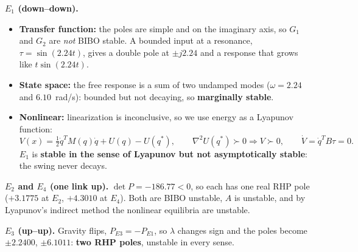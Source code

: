 \documentclass[12pt,a4paper]{article}
\begin{document}
\textbf{$E_1$ (down--down).}
\begin{itemize}
\item \textbf{Transfer function:} the poles are simple and on the imaginary axis, so $G_1$ and $G_2$ are \emph{not} BIBO stable. A bounded input at a resonance, $\tau=\sin(2.24t)$, gives a double pole at $\pm j2.24$ and a response that grows like $t\sin(2.24t)$.
\item \textbf{State space:} the free response is a sum of two undamped modes ($\omega=2.24$ and $6.10$~rad/s): bounded but not decaying, so \textbf{marginally stable}.
\item \textbf{Nonlinear:} linearization is inconclusive, so we use energy as a Lyapunov function:
\begin{equation}
V(x)=\tfrac12\dot q^TM(q)\dot q+U(q)-U(q^*),\qquad \nabla^2U(q^*)\succ0\Rightarrow V\succ0,\qquad \dot V=\dot q^TB\tau=0 .
\end{equation}
$E_1$ is \textbf{stable in the sense of Lyapunov but not asymptotically stable}: the swing never decays.
\end{itemize}

\textbf{$E_2$ and $E_4$ (one link up).} $\det P=-186.77<0$, so each has one real RHP pole ($+3.1775$ at $E_2$, $+4.3010$ at $E_4$). Both are BIBO unstable, $A$ is unstable, and by Lyapunov's indirect method the nonlinear equilibria are unstable.

\textbf{$E_3$ (up--up).} Gravity flips, $P_{E3}=-P_{E1}$, so $\lambda$ changes sign and the poles become $\pm2.2400$, $\pm6.1011$: \textbf{two RHP poles}, unstable in every sense.
\end{document}
